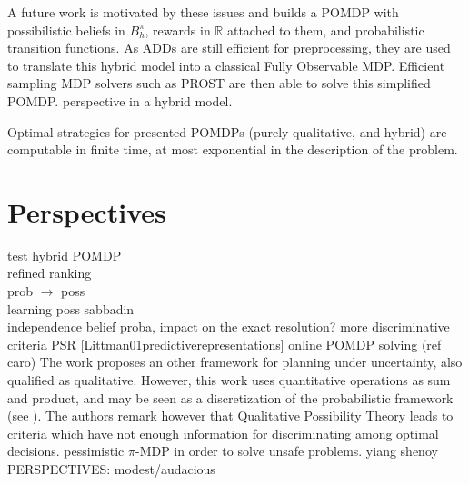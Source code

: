A future work is motivated by these issues
and builds a POMDP with possibilistic beliefs in $B_h^{\pi}$,
rewards in $\mathbb{R}$ attached to them,
and probabilistic transition functions.
As ADDs are still efficient for preprocessing,
they are used to translate this hybrid
model into a classical Fully Observable MDP.
Efficient sampling MDP solvers such as PROST 
are then able to solve this simplified POMDP. 
perspective in a hybrid model.


Optimal strategies for presented POMDPs (purely qualitative, and hybrid)
are computable in finite time, at most exponential in the description of the problem.


\section*{Perspectives}
test hybrid POMDP\\
refined ranking\\
prob $\rightarrow$ poss\\
learning poss sabbadin\\

independence belief proba, impact on the exact resolution?
\cite{LIP61723} more discriminative criteria
PSR \ref{Littman01predictiverepresentations}
online POMDP solving (ref caro)
The work \cite{Bonet:2002:QMP:2073876.2073884} proposes an other framework
for planning under uncertainty, also qualified as qualitative. 
However, this work uses quantitative operations
as sum and product, and may be seen as a discretization of the probabilistic framework
(see \cite{Wilson:1995:OMC:2074158.2074221}).
The authors remark however that Qualitative Possibility Theory leads to 
criteria which have not enough information for discriminating
among optimal decisions.
pessimistic $\pi$-MDP in order to solve unsafe problems. yiang shenoy
PERSPECTIVES: modest/audacious














